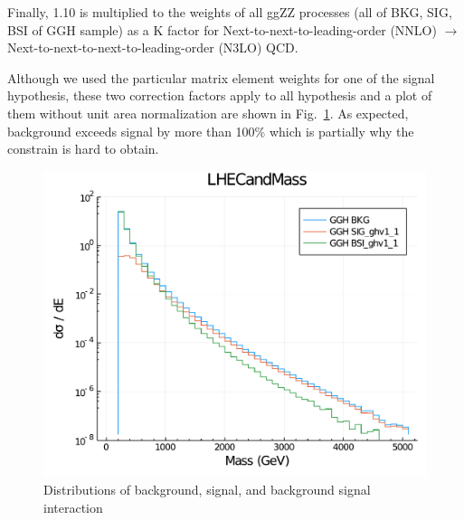 Finally, 1.10 is multiplied to the weights of all ggZZ processes (all of BKG, SIG, BSI
of GGH sample) as a K factor for Next-to-next-to-leading-order (NNLO) $\rightarrow$ 
Next-to-next-to-next-to-leading-order (N3LO) QCD.

Although we used the particular matrix element weights for one of the signal hypothesis, these two
correction factors apply to all hypothesis and a plot of them without unit area normalization are shown
in Fig.~\ref{fig:bsi_sig_bkg_compare}. As expected, background exceeds signal by more than 100\%
which is partially why the constrain is hard to obtain.
\begin{figure}[htb]
    \begin{center}
        \includegraphics[width=.7\linewidth]{fig/LHE_integral_difference.pdf}
    \end{center}
    \caption{Distributions of background, signal, and background signal interaction}
    \label{fig:bsi_sig_bkg_compare}
\end{figure}

